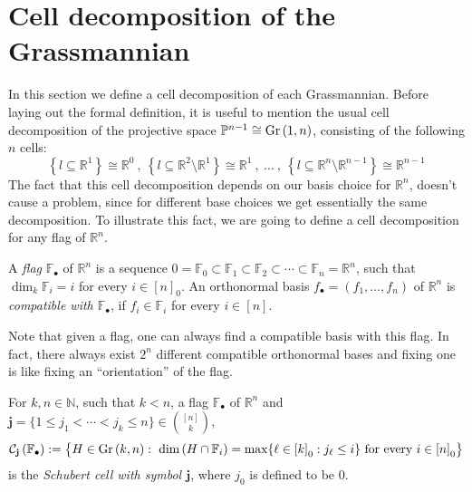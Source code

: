 \section{Cell decomposition of the Grassmannian}
In this section we define a cell decomposition of each Grassmannian. Before laying out the formal definition, it is useful to mention the usual cell decomposition of the projective space $\mathbb{P}^{n-1}\cong\Gr{1}{n}$, consisting of the following $n$ cells:
\[\left\{l\subseteq\mathbb{R}^1\right\}\cong\mathbb{R}^0\ ,\ \left\{l\subseteq\mathbb{R}^2\setminus\mathbb{R}^1\right\}\cong\mathbb{R}^1\ ,\ \ldots\ ,\ \left\{l\subseteq\mathbb{R}^n\setminus\mathbb{R}^{n-1}\right\}\cong\mathbb{R}^{n-1}\]
The fact that this cell decomposition depends on our basis choice for $\mathbb{R}^n$, doesn't cause a problem, since for different base choices we get essentially the same decomposition. To illustrate this fact, we are going to define a cell decomposition for any flag of $\mathbb{R}^n$.

\begin{definition} A \emph{flag} $\mathbb{F}_{\bullet}$ of $\mathbb{R}^n$ is a sequence $0=\mathbb{F}_0\subset\mathbb{F}_1\subset\mathbb{F}_2\subset\cdots\subset\mathbb{F}_n=\mathbb{R}^n$, such that $\dim_k\mathbb{F}_i = i$ for every $i\in[n]_0$. An orthonormal basis $f_{\bullet}=(f_1,\ldots,f_n)$ of $\mathbb{R}^n$ is \emph{compatible with $\mathbb{F}_{\bullet}$}, if $f_i\in\mathbb{F}_i$ for every $i\in[n]$.
\end{definition}

Note that given a flag, one can always find a compatible basis with this flag. In fact, there always exist $2^n$ different compatible orthonormal bases and fixing one is like fixing an ``orientation'' of the flag.

\begin{definition} For $k,n\in\mathbb{N}$, such that $k<n$, a flag $\mathbb{F}_{\bullet}$ of $\mathbb{R}^n$ and $\mathbf{j}=\{1\leq j_1<\cdots<j_k\leq n\}\in\binom{[n]}{k}$,
\[\grcell{j}:=\big\{H\in\Gr{k}{n}:\ \dim\left(H\cap\mathbb{F}_i\right)=\max\{\ell\in{[k]}_0:j_{\ell}\leq i\}\text{ for every }i\in{[n]}_0\big\}\]
is the \emph{Schubert cell with symbol $\mathbf{j}$}, where $j_0$ is defined to be $0$.
\end{definition}

